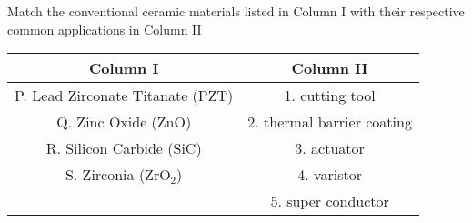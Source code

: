 \iffalse
\title{Assignment}
\author{EE24BTECH11038}
\section{xe}
\chapter{2007}
\fi
\item Match the conventional ceramic materials listed in Column I with their respective common applications in Column II

\begin{tabular}{|c|c|}
\hline
\textbf{Column I} & \textbf{Column II} \\
\hline
P. Lead Zirconate Titanate (PZT) & 1. cutting tool \\
Q. Zinc Oxide (ZnO) & 2. thermal barrier coating \\
R. Silicon Carbide (SiC) & 3. actuator \\
S. Zirconia (ZrO$_2$) & 4. varistor \\
 & 5. super conductor \\
\hline
\end{tabular}

